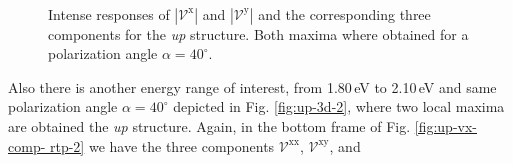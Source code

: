 \documentclass[prb,11pt,tightenlines,twocolumn,aps]{revtex4-1}
\begin{document}
\begin{figure}[t]
    \centering
    \\
    \caption{Intense responses of $|\mathcal{V}^{\mathrm{x}}|$ and
    $|\mathcal{V}^{\mathrm{y}}|$ and the corresponding three components for the
    \emph{up} structure. Both maxima where obtained for a polarization
    angle $\alpha=40^{\circ}$. }
    \label{fig:up-vab-comp-rtp-2}
\end{figure}
Also there is another energy range of interest, from 1.80\,eV to 2.10\,eV and
same polarization angle $\alpha=40^{\circ}$ depicted in Fig. \ref{fig:up-3d-2},
where two local maxima are obtained the \emph{up} structure. Again, in the
bottom frame of Fig. \ref{fig:up-vx-comp- rtp-2} we have the three components
$\mathcal{V}^{\mathrm{xx}}$, $\mathcal{V}^{\mathrm{xy}}$, and
\end{document}
